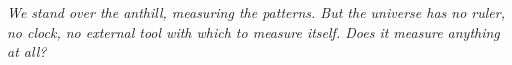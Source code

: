 \cleardoublepage
\thispagestyle{empty}

\begin{center}
  \vspace*{\fill} %


  \bigskip

  \begin{minipage}{0.80\textwidth}
    \epigraph{
      \textit{We stand over the anthill, measuring the patterns. But the universe has no ruler, no clock,
      no external tool with which to measure itself. Does it measure anything at all?}
    }{}
  \end{minipage}

  \vspace*{\fill} %
\end{center}